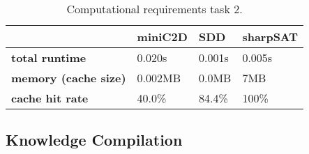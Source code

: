 \begin{table}[h]
	\centering
	\caption{Computational requirements task 2.}
	\label{table:comptask2}
	\begin{tabular}{l|l|l|l}
		\textbf{}        & \textbf{miniC2D} & \textbf{SDD} & \textbf{sharpSAT} \\ \hline
		\textbf{total runtime} &  0.020s  &   0.001s   &   0.005s  \\ \hline
		\textbf{memory (cache size)}  &  0.002MB  &   0.0MB &   7MB  \\ \hline
		\textbf{cache hit rate}  & 40.0\%  & 84.4\% &   100\%
	\end{tabular}
\end{table}

\subsection{Knowledge Compilation}\label{subsec:knowledgecompilation}

